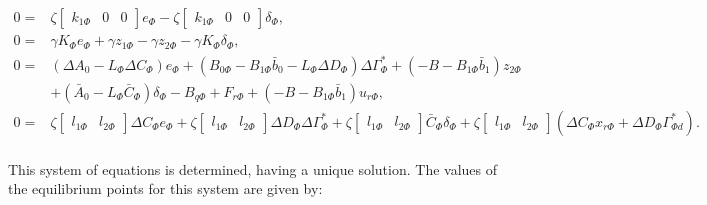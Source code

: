 \documentclass[../main.tex]{subfiles}
\begin{document}
\begin{align}
 0 =&  \zeta \begin{bmatrix}k_{1\Phi} & 0 & 0 \end{bmatrix} e_\Phi  - \zeta \begin{bmatrix}k_{1\Phi} & 0 & 0 \end{bmatrix} \delta_\Phi, \nonumber \\
 0 =&  \gamma K_\Phi e_\Phi + \gamma z_{1\Phi} - \gamma z_{2\Phi} - \gamma K_\Phi \delta_\Phi, \nonumber \\
0 =& (\Delta A_0 - L_\Phi \Delta C_\Phi) e_\Phi + (B_{0\Phi} - B_{1\Phi}\bar{b}_0 - L_\Phi \Delta D_\Phi ) \Delta \Gamma_\Phi^* + (-B - B_{1\Phi}\bar{b}_1)z_{2\Phi} \nonumber \\ &+ (\bar{A}_0 - L_\Phi \bar{C}_\Phi) \delta_\Phi- B_{q\Phi} + F_{r\Phi} + (-B - B_{1\Phi}\bar{b}_1)u_{r\Phi}, \nonumber \\
0 =& \zeta \begin{bmatrix}l_{1\Phi} & l_{2\Phi}\end{bmatrix} \Delta C_\Phi e_\Phi + \zeta \begin{bmatrix}l_{1\Phi} & l_{2\Phi}\end{bmatrix} \Delta D_\Phi \Delta \Gamma_\Phi^* + \zeta \begin{bmatrix}l_{1\Phi} & l_{2\Phi}\end{bmatrix} \bar{C}_\Phi \delta_\Phi + \zeta \begin{bmatrix}l_{1\Phi} & l_{2\Phi} \end{bmatrix}(\Delta C_\Phi x_{r\Phi} + \Delta D_\Phi \Gamma_{\Phi d}^*). \nonumber \\
 \end{align}
 
 This system of equations is determined, having a unique solution. The values of the equilibrium points for this system are given by:
 
\end{document}
